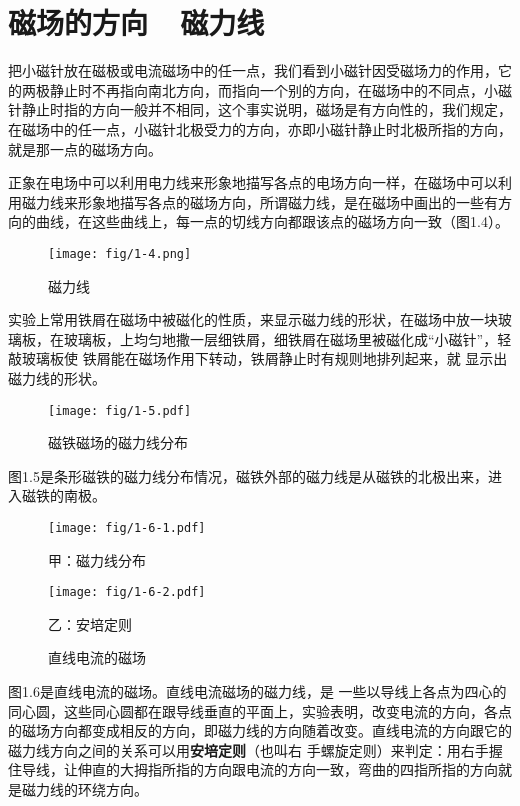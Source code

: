 \section{磁场的方向~~磁力线}
把小磁针放在磁极或电流磁场中的任一点，我们看到小磁针因受磁场力的作用，它的两极静止时不再指向南北方向，而指向一个别的方向，在磁场中的不同点，小磁针静止时指的方向一般并不相同，这个事实说明，磁场是有方向性的，我们规定，在磁场中的任一点，小磁针北极受力的方向，亦即小磁针静止时北极所指的方向，就是那一点的磁场方向。

正象在电场中可以利用电力线来形象地描写各点的电场方向一样，在磁场中可以利用磁力线来形象地描写各点的磁场方向，所谓磁力线，是在磁场中画出的一些有方向的曲线，在这些曲线上，每一点的切线方向都跟该点的磁场方向一致（图1.4）。
\begin{figure}[htp]\centering
\texttt{[image: fig/1-4.png]}
\caption{磁力线}
\end{figure}

实验上常用铁屑在磁场中被磁化的性质，来显示磁力线的形状，在磁场中放一块玻璃板，在玻璃板，上均匀地撒一层细铁屑，细铁屑在磁场里被磁化成“小磁针”，轻敲玻璃板使
铁屑能在磁场作用下转动，铁屑静止时有规则地排列起来，就
显示出磁力线的形状。

\begin{figure}[htp]\centering
\texttt{[image: fig/1-5.pdf]}
\caption{磁铁磁场的磁力线分布}
\end{figure}

图1.5是条形磁铁的磁力线分布情况，磁铁外部的磁力线是从磁铁的北极出来，进入磁铁的南极。

\begin{figure}[htp]
\centering
\begin{minipage}[t]{0.48\textwidth}
\centering
\texttt{[image: fig/1-6-1.pdf]}
\caption*{甲：磁力线分布}
\end{minipage}
\begin{minipage}[t]{0.48\textwidth}
\centering
\texttt{[image: fig/1-6-2.pdf]}
\caption*{乙：安培定则}
\end{minipage}
\caption{直线电流的磁场}
\end{figure}

图1.6是直线电流的磁场。直线电流磁场的磁力线，是
一些以导线上各点为四心的同心圆，这些同心圆都在跟导线垂直的平面上，实验表明，改变电流的方向，各点的磁场方向都变成相反的方向，即磁力线的方向随着改变。直线电流的方向跟它的磁力线方向之间的关系可以用\textbf{安培定则}（也叫右
手螺旋定则）来判定：用右手握住导线，让伸直的大拇指所指的方向跟电流的方向一致，弯曲的四指所指的方向就是磁力线的环绕方向。

